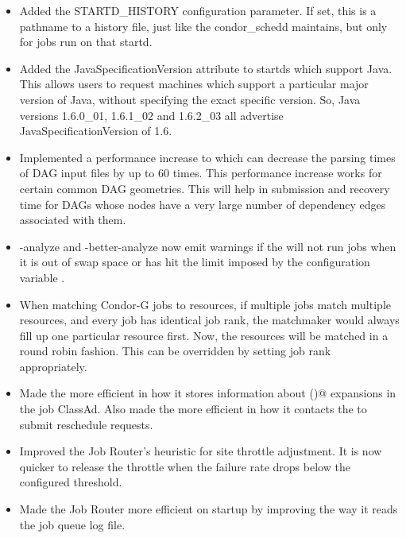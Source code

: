 \begin{itemize}

\item Added the STARTD\_HISTORY configuration parameter.  If set, this
is a pathname to a history file, just like the condor\_schedd maintains,
but only for jobs run on that startd.

\item Added the JavaSpecificationVersion attribute to startds which
support Java.  This allows users to request machines which support
a particular major version of Java, without specifying the exact
specific version.  So, Java versions 1.6.0\_01, 1.6.1\_02 and 1.6.2\_03
all advertise JavaSpecificationVersion of 1.6.

\item Implemented a performance increase to  which can
decrease the parsing times of DAG input files by up to 60 times.
This performance increase works for certain common DAG geometries.
This will help in submission and recovery
time for DAGs whose nodes have a very large number of dependency edges
associated with them.

\item {} -analyze and -better-analyze now emit warnings
if the  will not run jobs when it is out of swap space or
has hit the limit imposed by the configuration variable
.

\item When matching Condor-G jobs to resources, if multiple jobs
match multiple resources, and every job has identical job rank, the
matchmaker would always fill up one particular resource first.  Now,
the resources will be matched in a round robin fashion.  This can be
overridden by setting job rank appropriately.

\item Made the  more efficient in how it stores
information about \verb@$$()@ expansions in the job ClassAd.
Also made the  more efficient in how it contacts
the  to submit reschedule requests.

\item Improved the Job Router's heuristic for site throttle adjustment.  It
is now quicker to release the throttle when the failure rate drops
below the configured threshold.

\item Made the Job Router more efficient on startup by improving the way it
reads the job queue log file.


\end{itemize}
